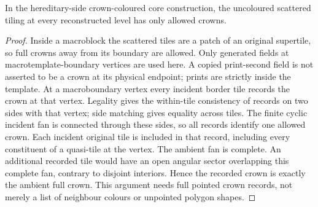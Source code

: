 \begin{lemma}
\label{lem:crown-colours}
In the hereditary-side crown-coloured core construction, the uncoloured scattered
tiling at every reconstructed level has only allowed crowns.
\end{lemma}
\begin{proof}
Inside a macroblock the scattered tiles are a patch of an original
supertile, so full crowns away from its boundary are allowed.
Only generated fields at macrotemplate-boundary vertices are used here.
A copied print-second field is not asserted to be a crown at its physical
endpoint; prints are strictly inside the template.
At a macroboundary vertex every incident border tile records the crown
at that vertex. Legality gives the within-tile consistency of records on
two sides with that vertex; side matching gives equality across tiles.
The finite cyclic incident fan is connected through these sides, so all
records identify one allowed crown. Each incident original tile is included
in that record, including every constituent of a quasi-tile at the vertex.
The ambient fan is complete. An additional recorded tile would have an
open angular sector overlapping this complete fan, contrary to disjoint
interiors. Hence the recorded crown is exactly the ambient full crown.
This argument needs full pointed crown records, not merely a list of
neighbour colours or unpointed polygon shapes.
\end{proof}


